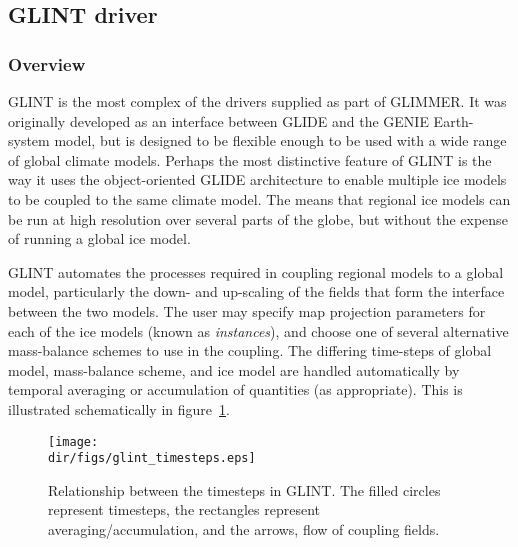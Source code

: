 \newpage
\subsection{GLINT driver}
\subsubsection{Overview}
%
GLINT is the most complex of the drivers supplied as part of GLIMMER. It was
originally developed as an interface between GLIDE and the GENIE Earth-system
model, but is designed to be flexible enough to be used with a wide range of
global climate models. Perhaps the most distinctive feature of GLINT is the
way it uses the object-oriented GLIDE architecture to enable multiple ice
models to be coupled to the same climate model. The means that regional ice
models can be run at high resolution over several parts of the globe, but
without the expense of running a global ice model.

GLINT automates the processes required in coupling regional models to a global
model, particularly the down- and up-scaling of the fields that form the
interface between the two models. The user may specify map projection
parameters for each of the ice models (known as \emph{instances}), and choose
one of several alternative mass-balance schemes to use in the coupling. The
differing time-steps of global model, mass-balance scheme, and ice model are
handled automatically by temporal averaging or accumulation of quantities (as
appropriate). This is illustrated schematically in figure~\ref{ug.fig.glint_timesteps}.  
%
\begin{figure}[htbp]
  \centering
  \texttt{[image: \\dir/figs/glint\_timesteps.eps]}
  \caption{Relationship between the timesteps in GLINT. The filled circles
  represent timesteps, the rectangles represent averaging/accumulation, and the arrows,
  flow of coupling fields.}
  \label{ug.fig.glint_timesteps}
\end{figure}
%
